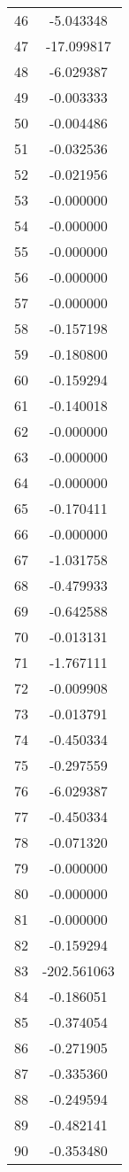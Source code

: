 \documentclass[12pt]{article}
\begin{document}
\begin{longtable}{@{}cc@{}}
46 & -5.043348 \\
47 & -17.099817 \\
48 & -6.029387 \\
49 & -0.003333 \\
50 & -0.004486 \\
51 & -0.032536 \\
52 & -0.021956 \\
53 & -0.000000 \\
54 & -0.000000 \\
55 & -0.000000 \\
56 & -0.000000 \\
57 & -0.000000 \\
58 & -0.157198 \\
59 & -0.180800 \\
60 & -0.159294 \\
61 & -0.140018 \\
62 & -0.000000 \\
63 & -0.000000 \\
64 & -0.000000 \\
65 & -0.170411 \\
66 & -0.000000 \\
67 & -1.031758 \\
68 & -0.479933 \\
69 & -0.642588 \\
70 & -0.013131 \\
71 & -1.767111 \\
72 & -0.009908 \\
73 & -0.013791 \\
74 & -0.450334 \\
75 & -0.297559 \\
76 & -6.029387 \\
77 & -0.450334 \\
78 & -0.071320 \\
79 & -0.000000 \\
80 & -0.000000 \\
81 & -0.000000 \\
82 & -0.159294 \\
83 & -202.561063 \\
84 & -0.186051 \\
85 & -0.374054 \\
86 & -0.271905 \\
87 & -0.335360 \\
88 & -0.249594 \\
89 & -0.482141 \\
90 & -0.353480 \\

\end{longtable}
\end{document}
